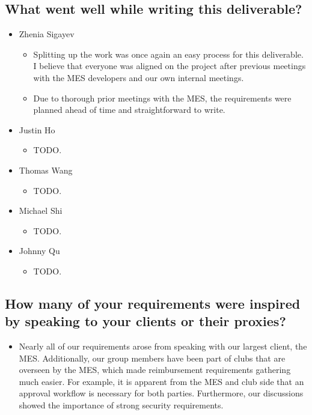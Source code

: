 \documentclass[12pt]{article}
\begin{document}
  \subsection{What went well while writing this deliverable?}
   \begin{itemize}
    \item Zhenia Sigayev
      \begin{itemize}[label=$\circ$]
        \item Splitting up the work was once again an easy process for this deliverable. I believe that everyone was aligned on the project after previous meetings with the MES developers and our own internal meetings.
        \item Due to thorough prior meetings with the MES, the requirements were planned ahead of time and straightforward to write.
      \end{itemize}
    \item Justin Ho
      \begin{itemize}[label=$\circ$]
        \item TODO.
      \end{itemize}
    \item Thomas Wang
      \begin{itemize}[label=$\circ$]
        \item TODO.
      \end{itemize}
    \item Michael Shi
      \begin{itemize}[label=$\circ$]
        \item TODO.
      \end{itemize}
    \item Johnny Qu
      \begin{itemize}[label=$\circ$]
        \item TODO.
      \end{itemize}
  \end{itemize}

  \subsection{How many of your requirements were inspired by speaking to your clients or their proxies?}
    \begin{itemize}
      \item Nearly all of our requirements arose from speaking with our largest client, the MES. Additionally, our group members have been part of clubs that are overseen by the MES, which made reimbursement requirements gathering much easier. For example, it is apparent from the MES and club side that an approval workflow is necessary for both parties. Furthermore, our discussions showed the importance of strong security requirements.
    \end{itemize}
\end{document}
